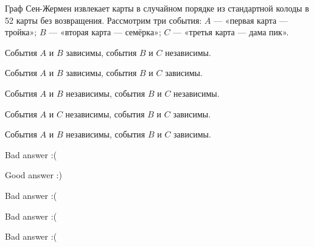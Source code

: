 
\begin{question}
Граф Сен-Жермен извлекает карты в случайном порядке из стандартной
колоды в 52 карты без возвращения. Рассмотрим три события: \(A\) —
«первая карта — тройка»; \(B\) — «вторая карта — семёрка»; \(C\)
— «третья карта — дама пик».
\begin{answerlist}
  \item События \(A\) и \(B\) зависимы, события \(B\) и \(C\) независимы.
  \item События \(A\) и \(B\) зависимы, события \(B\) и \(C\) зависимы.
  \item События \(A\) и \(B\) независимы, события \(B\) и \(C\) независимы.
  \item События \(A\) и \(C\) независимы, события \(B\) и \(C\) зависимы.
  \item События \(A\) и \(B\) независимы, события \(B\) и \(C\) зависимы.
\end{answerlist}
\end{question}

\begin{solution}
\begin{answerlist}
  \item Bad answer :(
  \item Good answer :)
  \item Bad answer :(
  \item Bad answer :(
  \item Bad answer :(
\end{answerlist}
\end{solution}

